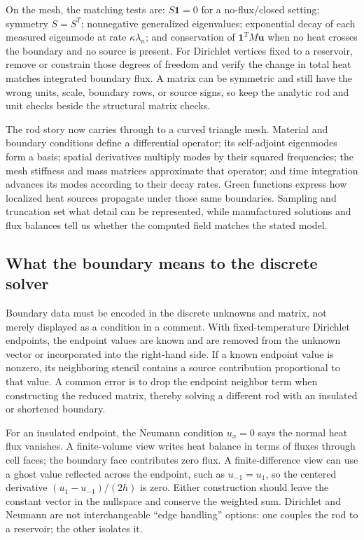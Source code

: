 On the mesh, the matching tests are: \(S\mathbf1=0\) for a no-flux/closed setting; symmetry \(S=S^T\); nonnegative generalized eigenvalues; exponential decay of each measured eigenmode at rate \(\kappa\lambda_n\); and conservation of \(\mathbf1^TM\mathbf u\) when no heat crosses the boundary and no source is present. For Dirichlet vertices fixed to a reservoir, remove or constrain those degrees of freedom and verify the change in total heat matches integrated boundary flux. A matrix can be symmetric and still have the wrong units, scale, boundary rows, or source signs, so keep the analytic rod and unit checks beside the structural matrix checks.

The rod story now carries through to a curved triangle mesh. Material and boundary conditions define a differential operator; its self-adjoint eigenmodes form a basis; spatial derivatives multiply modes by their squared frequencies; the mesh stiffness and mass matrices approximate that operator; and time integration advances its modes according to their decay rates. Green functions express how localized heat sources propagate under those same boundaries. Sampling and truncation set what detail can be represented, while manufactured solutions and flux balances tell us whether the computed field matches the stated model.

\subsection{What the boundary means to the discrete solver}\label{04-visual-computing-ii-ch030-what-the-boundary-means-to-the-discrete-solver}

\hypertarget{04-visual-computing-ii-ch030-what-the-boundary-means-to-the-discrete-solver}{}

Boundary data must be encoded in the discrete unknowns and matrix, not merely displayed as a condition in a comment. With fixed-temperature Dirichlet endpoints, the endpoint values are known and are removed from the unknown vector or incorporated into the right-hand side. If a known endpoint value is nonzero, its neighboring stencil contains a source contribution proportional to that value. A common error is to drop the endpoint neighbor term when constructing the reduced matrix, thereby solving a different rod with an insulated or shortened boundary.

For an insulated endpoint, the Neumann condition \(u_x=0\) says the normal heat flux vanishes. A finite-volume view writes heat balance in terms of fluxes through cell faces; the boundary face contributes zero flux. A finite-difference view can use a ghost value reflected across the endpoint, such as \(u_{-1}=u_1\), so the centered derivative \((u_1-u_{-1})/(2h)\) is zero. Either construction should leave the constant vector in the nullspace and conserve the weighted sum. Dirichlet and Neumann are not interchangeable ``edge handling'' options: one couples the rod to a reservoir; the other isolates it.

